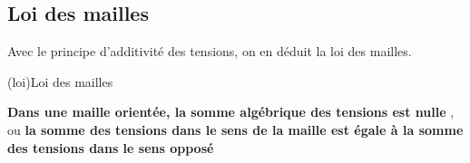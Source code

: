\documentclass[../../main/main.tex]{subfiles}
\begin{document}
\subsection{Loi des mailles}

Avec le principe d'additivité des tensions, on en déduit la loi des mailles.
\begin{tcb*}[label=loi:mailles, sidebyside, halign upper=center](loi){Loi des mailles}

	\textbf{Dans une maille orientée, la somme algébrique des tensions est nulle
	}, ou \textbf{la somme des tensions dans le sens de la maille est égale à la
		somme des tensions dans le sens opposé}
	\tcblower
	\begin{center}
	\end{center}
\end{tcb*}
\end{document}
